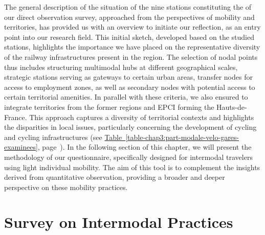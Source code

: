 \begin{refsegment}
The general description of the situation of the nine stations constituting the  of our direct observation survey, approached from the perspectives of mobility and territories, has provided us with an overview to initiate our reflection, as an entry point into our research field. This initial sketch, developed based on the studied stations, highlights the importance we have placed on the representative diversity of the railway infrastructures present in the region. The selection of nodal points thus includes structuring multimodal hubs at different geographical scales, strategic stations serving as gateways to certain urban areas, transfer nodes for access to employment zones, as well as secondary nodes with potential access to certain territorial amenities. In parallel with these criteria, we also ensured to integrate territories from the former regions and \acrshort{EPCI} forming the Hauts-de-France. This approach captures a diversity of territorial contexts and highlights the disparities in local issues, particularly concerning the development of cycling and cycling infrastructures (see \hyperref[table-chap3:part-modale-velo-gares-examinees]{Table~\ref{table-chap3:part-modale-velo-gares-examinees}}, page~\pageref{table-chap3:part-modale-velo-gares-examinees}). In the following section of this chapter, we will present the methodology of our questionnaire, specifically designed for intermodal travelers using light individual mobility. The aim of this tool is to complement the insights derived from quantitative observation, providing a broader and deeper perspective on these mobility practices.%

\newpage
{} %
\section{Survey on Intermodal Practices
    \label{chap3:questionnaire}
    }


\end{refsegment}
